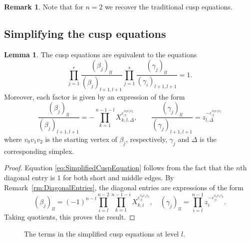 \documentclass[12pt]{amsart}
\theoremstyle{definition}
\newtheorem{lemma}[theorem]{Lemma}
\newtheorem{remark}[theorem]{Remark}
\numberwithin{equation}{section}
\begin{document}
\begin{remark}
Note that for $n=2$ we recover the traditional cusp equations.%
\end{remark}

\subsection{Simplifying the cusp equations}

\begin{lemma} 
The cusp equations are equivalent to the equations
\begin{equation} \label{eq:SimplifiedCuspEquation}
\prod_{j=1}^r\frac{(\beta_j)_{ll}}{(\beta_j)_{l+1,l+1}}\prod_{j=1}^s\frac{(\gamma_j)_{ll}}{(\gamma_i)_{l+1,l+1}}=1.
\end{equation}
Moreover, each factor is given by an expression of the form
\begin{equation}\label{eq:Simplification}
\frac{(\beta_j)_{ll}}{(\beta_j)_{l+1,l+1}}=-\prod_{k=1}^{n-1-l}X_{k,l,\Delta}^{\varepsilon_\circlearrowleft^{v_0v_1v_2}},\qquad \frac{(\gamma_j)_{ll}}{(\gamma_j)_{l+1,l+1}}=z_{l,\Delta}^{-\varepsilon_\circlearrowleft^{v_0v_1v_2}}
\end{equation}
where $v_0v_1v_2$ is the starting vertex of $\beta_j$, respectively, $\gamma_j$ and $\Delta$ is the corresponding simplex.
\end{lemma}

\begin{proof}
Equation \eqref{eq:SimplifiedCuspEquation} follows from the fact that the $n$th diagonal entry is $1$ for both short and middle edges.
By Remark~\ref{rm:DiagonalEntries}, the diagonal entries are expressions of the form
\begin{equation}
\label{main}
(\beta_j)_{ll}=(-1)^{n-l}\prod_{i=l}^{n-2}\prod_{k=1}^{n-1-i}X_{k,i}^{\varepsilon_\circlearrowleft^{v_0v_1v_2}},\quad (\gamma_j)_{ll}=\prod_{i=l}^{n-1}z_i^{-\varepsilon_\circlearrowleft^{v_0v_1v_2}}.
\end{equation}
Taking quotients, this proves the result.
\end{proof}



\begin{figure}[htb]
\begin{center}
\scalebox{0.9}{
}
\end{center}
\caption{The terms in the simplified cusp equations at level $l$.}\label{fig:CuspEqTerms}
\end{figure}
\end{document}
